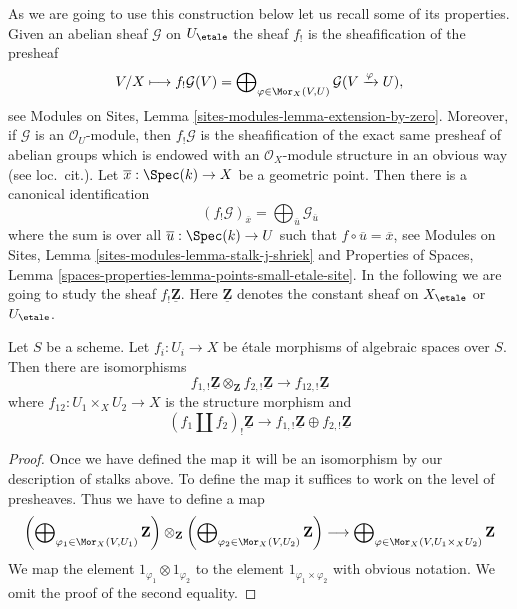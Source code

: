 \medskip\noindent
As we are going to use this construction below let us recall some of its
properties. Given an abelian sheaf $\mathcal{G}$ on $U_\etale$
the sheaf $f_!$ is the sheafification of the presheaf
$$
V/X \longmapsto
f_!\mathcal{G}(V) =
\bigoplus\nolimits_{\varphi \in \Mor_X(V, U)}
\mathcal{G}(V \xrightarrow{\varphi} U),
$$
see
Modules on Sites, Lemma \ref{sites-modules-lemma-extension-by-zero}.
Moreover, if $\mathcal{G}$ is an $\mathcal{O}_U$-module, then $f_!\mathcal{G}$
is the sheafification of the exact same presheaf of abelian groups which
is endowed with an $\mathcal{O}_X$-module structure in an obvious way
(see loc.\ cit.). Let $\overline{x} : \Spec(k) \to X$
be a geometric point. Then there is a canonical identification
$$
(f_!\mathcal{G})_{\overline{x}} =
\bigoplus\nolimits_{\overline{u}} \mathcal{G}_{\overline{u}}
$$
where the sum is over all $\overline{u} : \Spec(k) \to U$ such that
$f \circ \overline{u} = \overline{x}$, see
Modules on Sites, Lemma \ref{sites-modules-lemma-stalk-j-shriek}
and
Properties of Spaces, Lemma
\ref{spaces-properties-lemma-points-small-etale-site}.
In the following we are going to study the sheaf $f_!\underline{\mathbf{Z}}$.
Here $\underline{\mathbf{Z}}$ denotes the constant sheaf on
$X_\etale$ or $U_\etale$.

\begin{lemma}
\label{lemma-product-is-tensor-product}
Let $S$ be a scheme. Let $f_i : U_i \to X$ be \'etale morphisms
of algebraic spaces over $S$. Then there are isomorphisms
$$
f_{1, !}\underline{\mathbf{Z}} \otimes_{\mathbf{Z}}
f_{2, !}\underline{\mathbf{Z}}
\longrightarrow
f_{12, !}\underline{\mathbf{Z}}
$$
where $f_{12} : U_1 \times_X U_2 \to X$ is the structure morphism
and
$$
(f_1 \amalg f_2)_! \underline{\mathbf{Z}}
\longrightarrow
f_{1, !}\underline{\mathbf{Z}} \oplus
f_{2, !}\underline{\mathbf{Z}}
$$
\end{lemma}

\begin{proof}
Once we have defined the map it will be an isomorphism by our description
of stalks above. To define the map it suffices to work on the level of
presheaves. Thus we have to define a map
$$
\left(\bigoplus\nolimits_{\varphi_1 \in \Mor_X(V, U_1)} \mathbf{Z}\right)
\otimes_{\mathbf{Z}}
\left(\bigoplus\nolimits_{\varphi_2 \in \Mor_X(V, U_2)} \mathbf{Z}\right)
\longrightarrow
\bigoplus\nolimits_{\varphi \in \Mor_X(V, U_1 \times_X U_2)}
\mathbf{Z}
$$
We map the element $1_{\varphi_1} \otimes 1_{\varphi_2}$ to the element
$1_{\varphi_1 \times \varphi_2}$ with obvious notation. We omit the proof
of the second equality.
\end{proof}

